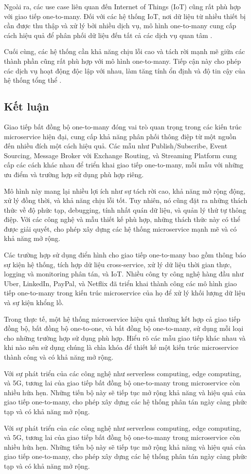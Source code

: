 Ngoài ra, các use case liên quan đến Internet of Things (IoT) cũng rất phù hợp với giao tiếp one-to-many. Đối với các hệ thống IoT, nơi dữ liệu từ nhiều thiết bị cần được thu thập và xử lý bởi nhiều dịch vụ, mô hình one-to-many cung cấp cách hiệu quả để phân phối dữ liệu đến tất cả các dịch vụ quan tâm \cite{indrasiri2020}.

Cuối cùng, các hệ thống cần khả năng chịu lỗi cao và tách rời mạnh mẽ giữa các thành phần cũng rất phù hợp với mô hình one-to-many. Tiếp cận này cho phép các dịch vụ hoạt động độc lập với nhau, làm tăng tính ổn định và độ tin cậy của hệ thống tổng thể \cite{fowler2002}.

\subsection{Kết luận}
Giao tiếp bất đồng bộ one-to-many đóng vai trò quan trọng trong các kiến trúc microservice hiện đại, cung cấp khả năng phân phối thông điệp từ một nguồn đến nhiều đích một cách hiệu quả. Các mẫu như Publish/Subscribe, Event Sourcing, Message Broker với Exchange Routing, và Streaming Platform cung cấp các cách khác nhau để triển khai giao tiếp one-to-many, mỗi mẫu với những ưu điểm và trường hợp sử dụng phù hợp riêng.

Mô hình này mang lại nhiều lợi ích như sự tách rời cao, khả năng mở rộng động, xử lý đồng thời, và khả năng chịu lỗi tốt. Tuy nhiên, nó cũng đặt ra những thách thức về độ phức tạp, debugging, tính nhất quán dữ liệu, và quản lý thứ tự thông điệp. Với các công nghệ và mẫu thiết kế phù hợp, những thách thức này có thể được giải quyết, cho phép xây dựng các hệ thống microservice mạnh mẽ và có khả năng mở rộng.

Các trường hợp sử dụng điển hình cho giao tiếp one-to-many bao gồm thông báo sự kiện hệ thống, tích hợp dữ liệu cross-service, xử lý dữ liệu thời gian thực, logging và monitoring phân tán, và IoT. Nhiều công ty công nghệ hàng đầu như Uber, LinkedIn, PayPal, và Netflix đã triển khai thành công các mô hình giao tiếp one-to-many trong kiến trúc microservice của họ để xử lý khối lượng dữ liệu và sự kiện khổng lồ.

Trong thực tế, một hệ thống microservice hiệu quả thường kết hợp cả giao tiếp đồng bộ, bất đồng bộ one-to-one, và bất đồng bộ one-to-many, sử dụng mỗi loại cho những trường hợp sử dụng phù hợp. Hiểu rõ các mẫu giao tiếp khác nhau và khi nào nên sử dụng chúng là chìa khóa để thiết kế một kiến trúc microservice thành công và có khả năng mở rộng.

Với sự phát triển của các công nghệ như serverless computing, edge computing, và 5G, tương lai của giao tiếp bất đồng bộ one-to-many trong microservice còn nhiều hứa hẹn. Những tiến bộ này sẽ tiếp tục mở rộng khả năng và hiệu quả của giao tiếp one-to-many, cho phép xây dựng các hệ thống phân tán ngày càng phức tạp và có khả năng mở rộng.

Với sự phát triển của các công nghệ như serverless computing, edge computing, và 5G, tương lai của giao tiếp bất đồng bộ one-to-many trong microservice còn nhiều hứa hẹn. Những tiến bộ này sẽ tiếp tục mở rộng khả năng và hiệu quả của giao tiếp one-to-many, cho phép xây dựng các hệ thống phân tán ngày càng phức tạp và có khả năng mở rộng.